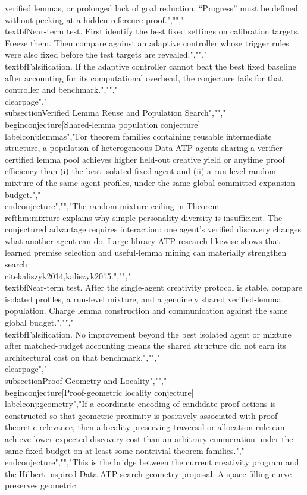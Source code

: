 {{{verified lemmas, or prolonged lack of goal reduction. ``Progress'' must be defined without peeking at a hidden reference proof.","","\\textbf{Near-term test.} First identify the best fixed settings on calibration targets. Freeze them. Then compare against an adaptive controller whose trigger rules were also fixed before the test targets are revealed.","","\\textbf{Falsification.} If the adaptive controller cannot beat the best fixed baseline after accounting for its computational overhead, the conjecture fails for that controller and benchmark.","","\\clearpage","\\subsection{Verified Lemma Reuse and Population Search}","","\\begin{conjecture}[Shared-lemma population conjecture]\\label{conj:lemmas}","For theorem families containing reusable intermediate structure, a population of heterogeneous Data-ATP agents sharing a verifier-certified lemma pool achieves higher held-out creative yield or anytime proof efficiency than (i) the best isolated fixed agent and (ii) a run-level random mixture of the same agent profiles, under the same global committed-expansion budget.","\\end{conjecture}","","The random-mixture ceiling in Theorem~\\ref{thm:mixture} explains why simple personality diversity is insufficient. The conjectured advantage requires interaction: one agent's verified discovery changes what another agent can do. Large-library ATP research likewise shows that learned premise selection and useful-lemma mining can materially strengthen search \\cite{kaliszyk2014,kaliszyk2015}.","","\\textbf{Near-term test.} After the single-agent creativity protocol is stable, compare isolated profiles, a run-level mixture, and a genuinely shared verified-lemma population. Charge lemma construction and communication against the same global budget.","","\\textbf{Falsification.} No improvement beyond the best isolated agent or mixture after matched-budget accounting means the shared structure did not earn its architectural cost on that benchmark.","","\\clearpage","\\subsection{Proof Geometry and Locality}","","\\begin{conjecture}[Proof-geometric locality conjecture]\\label{conj:geometry}","If a coordinate encoding of candidate proof actions is constructed so that geometric proximity is positively associated with proof-theoretic relevance, then a locality-preserving traversal or allocation rule can achieve lower expected discovery cost than an arbitrary enumeration under the same fixed budget on at least some nontrivial theorem families.","\\end{conjecture}","","This is the bridge between the current creativity program and the Hilbert-inspired Data-ATP search-geometry proposal. A space-filling curve preserves geometric }}}
